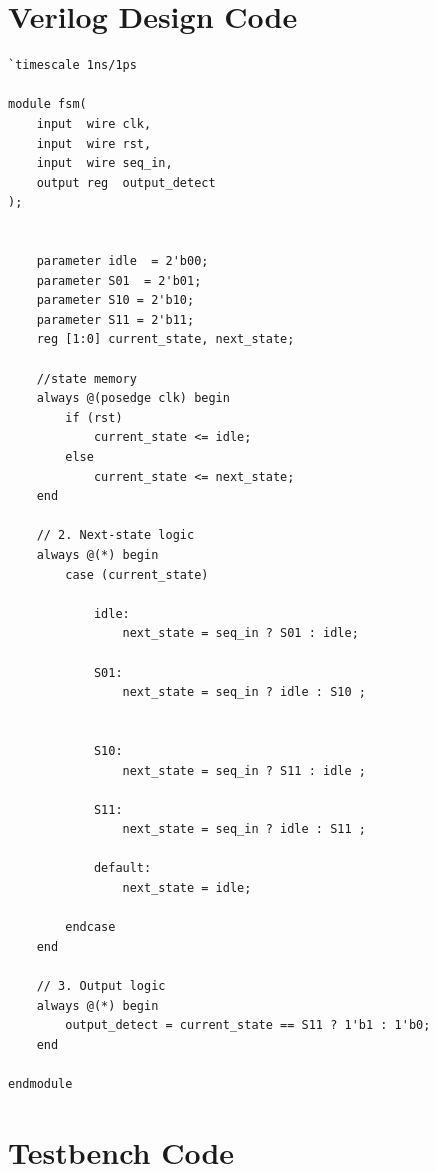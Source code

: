 \documentclass[12pt,a4paper]{report}
\begin{document}
\section{Verilog Design Code}

\begin{verilogbox}
\begin{lstlisting}
`timescale 1ns/1ps

module fsm(
    input  wire clk,
    input  wire rst,
    input  wire seq_in,
    output reg  output_detect
);

    
    parameter idle  = 2'b00;
    parameter S01  = 2'b01;
    parameter S10 = 2'b10;
    parameter S11 = 2'b11;
    reg [1:0] current_state, next_state;

    //state memory 
    always @(posedge clk) begin
        if (rst)
            current_state <= idle;
        else
            current_state <= next_state;
    end

    // 2. Next-state logic
    always @(*) begin
        case (current_state)
        
            idle:
                next_state = seq_in ? S01 : idle;

            S01:
                next_state = seq_in ? idle : S10 ; 
               
                
            S10:
                next_state = seq_in ? S11 : idle ; 

            S11:
                next_state = seq_in ? idle : S11 ;

            default:
                next_state = idle;

        endcase
    end

    // 3. Output logic
    always @(*) begin
        output_detect = current_state == S11 ? 1'b1 : 1'b0;
    end

endmodule
\end{lstlisting}
\end{verilogbox}

\section{Testbench Code}
\end{document}
